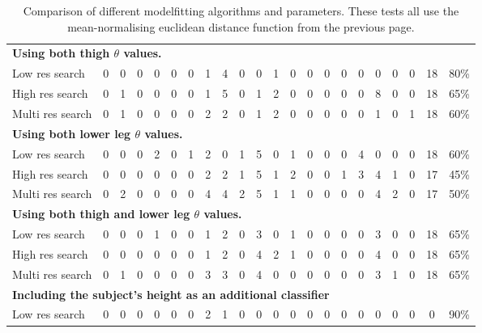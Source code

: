 \begin{landscape}
\begin{table}[p]
\begin{tabular}{|l|c@{ }c|c@{ }c|c@{ }c|c@{ }c|c@{ }c|c@{ }c|c@{ }c|c@{ }c|c@{ }c|c@{ }c|c|}
			\hline
			\multicolumn{22}{|l|}{\textbf{Using both thigh $\theta$ values.}} \\
			Low res search             & 0 & 0 & 0 & 0 & 0 & 0 & 1 & 4 & 0 & 0 & 1 & 0 & 0 & 0 & 0 & 0 & 0 & 0 & 0 & 18 & 80\% \\
			High res search            & 0 & 1 & 0 & 0 & 0 & 0 & 1 & 5 & 0 & 1 & 2 & 0 & 0 & 0 & 0 & 0 & 8 & 0 & 0 & 18 & 65\% \\
			Multi res search           & 0 & 1 & 0 & 0 & 0 & 0 & 2 & 2 & 0 & 1 & 2 & 0 & 0 & 0 & 0 & 0 & 1 & 0 & 1 & 18 & 60\% \\
			
			\hline
			\multicolumn{22}{|l|}{\textbf{Using both lower leg $\theta$ values.}} \\
			Low res search             & 0 & 0 & 0 & 2 & 0 & 1 & 2 & 0 & 1 & 5 & 0 & 1 & 0 & 0 & 0 & 4 & 0 & 0 & 0 & 18 & 60\% \\
			High res search            & 0 & 0 & 0 & 0 & 0 & 0 & 2 & 2 & 1 & 5 & 1 & 2 & 0 & 0 & 1 & 3 & 4 & 1 & 0 & 17 & 45\% \\
			Multi res search           & 0 & 2 & 0 & 0 & 0 & 0 & 4 & 4 & 2 & 5 & 1 & 1 & 0 & 0 & 0 & 0 & 4 & 2 & 0 & 17 & 50\% \\
			
			\hline
			\multicolumn{22}{|l|}{\textbf{Using both thigh and lower leg $\theta$ values.}} \\
			Low res search             & 0 & 0 & 0 & 1 & 0 & 0 & 1 & 2 & 0 & 3 & 0 & 1 & 0 & 0 & 0 & 0 & 3 & 0 & 0 & 18 & 65\% \\
			High res search            & 0 & 0 & 0 & 0 & 0 & 0 & 1 & 2 & 0 & 4 & 2 & 1 & 0 & 0 & 0 & 0 & 4 & 0 & 0 & 18 & 65\% \\
			Multi res search           & 0 & 1 & 0 & 0 & 0 & 0 & 3 & 3 & 0 & 4 & 0 & 0 & 0 & 0 & 0 & 0 & 3 & 1 & 0 & 18 & 65\% \\
			
			\hline
			\multicolumn{22}{|l|}{\textbf{Including the subject's height as an additional classifier}} \\
			Low res search             & 0 & 0 & 0 & 0 & 0 & 0 & 2 & 1 & 0 & 0 & 0 & 0 & 0 & 0 & 0 & 0 & 0 & 0 & 0 & 0 & 90\% \\
			
			\hline
		\end{tabular}
		\caption{Comparison of different modelfitting algorithms and parameters.
			These tests all use the mean-normalising euclidean distance function from the previous page.}
		\label{ClassificationResults2}
	\end{table}
\end{landscape}

